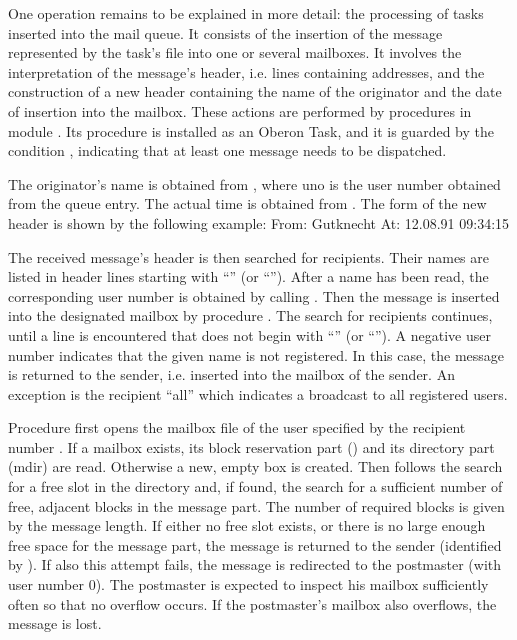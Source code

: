 One operation remains to be explained in more detail: the processing of tasks inserted into the mail queue. It consists of the insertion of the message represented by the task's file into one or several mailboxes. It involves the interpretation of the message's header, i.e. lines containing addresses, and the construction of a new header containing the name of the originator and the date of insertion into the mailbox. These actions are performed by procedures in module . Its procedure  is installed as an Oberon Task, and it is guarded by the condition , indicating that at least one message needs to be dispatched.

The originator's name is obtained from , where uno is the user number obtained from the queue entry. The actual time is obtained from . The form of the new header is shown by the following example:
\begintt
From: Gutknecht
At: 12.08.91 09:34:15
\endtt

\noindent The received message's header is then searched for recipients. Their names are listed in header lines starting with ``'' (or ``''). After a name has been read, the corresponding user number is obtained by calling . Then the message is inserted into the designated mailbox by procedure . The search for recipients continues, until a line is encountered that does not begin with ``'' (or ``''). A negative user number indicates that the given name is not registered. In this case, the message is returned to the sender, i.e. inserted into the mailbox of the sender. An exception is the recipient ``all'' which indicates a broadcast to all registered users.

Procedure  first opens the mailbox file of the user specified by the recipient number . If a mailbox exists, its block reservation part () and its directory part (mdir) are read. Otherwise a new, empty box is created. Then follows the search for a free slot in the directory and, if found, the search for a sufficient number of free, adjacent blocks in the message part. The number of required blocks is given by the message length. If either no free slot exists, or there is no large enough free space for the message part, the message is returned to the sender (identified by ). If also this attempt fails, the message is redirected to the postmaster (with user number 0). The postmaster is expected to inspect his mailbox sufficiently often so that no overflow occurs. If the postmaster's mailbox also overflows, the message is lost.

